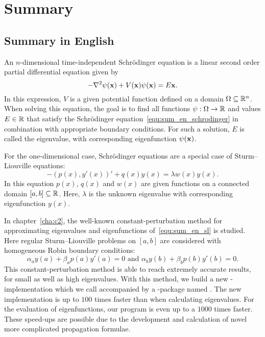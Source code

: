 


\chapter*{Summary}


\section*{Summary in English}

An $n$-dimensional time-independent Schrödinger equation is a linear second order partial differential equation given by
\begin{equation}\label{equ:sum_en_schrodinger}
-\nabla^2 \psi(\vb{x}) + V(\vb{x}) \psi(\vb{x}) = E\vb{x}\text{.}
\end{equation}
In this expression, $V$ is a given potential function defined on a domain $\Omega \subseteq \mathbb{R}^n$. When solving this equation, the goal is to find all functions $\psi : \Omega \to \mathbb{R}$ and values $E \in \mathbb{R}$ that satisfy the Schrödinger equation~\eqref{equ:sum_en_schrodinger} in combination with appropriate boundary conditions. For such a solution, $E$ is called the eigenvalue, with corresponding eigenfunction $\psi(\vb{x})$.

For the one-dimensional case, Schrödinger equations are a special case of Sturm--Liouville equations:
\begin{equation}\label{equ:sum_en_sl}
    -(p(x), y'(x))' + q(x) y(x) = \lambda w(x) y(x) \text{.}
\end{equation}
In this equation $p(x)$, $q(x)$ and $w(x)$ are given functions on a connected domain $[a, b] \subseteq \mathbb{R}$. Here, $\lambda$ is the unknown eigenvalue with corresponding eigenfunction $y(x)$.

In chapter~\ref{cha:c2}, the well-known constant-perturbation method for approximating eigenvalues and eigenfunctions of~\eqref{equ:sum_en_sl} is studied. Here regular Sturm--Liouville problems on $[a, b]$ are considered with homogeneous Robin boundary conditions:
$$
\alpha_a y(a) + \beta_a p(a) y'(a) = 0 \text{ and } \alpha_b y(b) + \beta_b p(b) y'(b) = 0\text{.}
$$
This constant-perturbation method is able to reach extremely accurate results, for small as well as high eigenvalues. With this method, we build a new \cpp{}-implementation which we call  accompanied by a \lpython{}-package named \pyslise{}. The new implementation is up to $100$ times faster than  when calculating eigenvalues. For the evaluation of eigenfunctions, our program is even up to a $1000$ times faster. These speed-ups are possible due to the development and calculation of novel more complicated propagation formulae.

